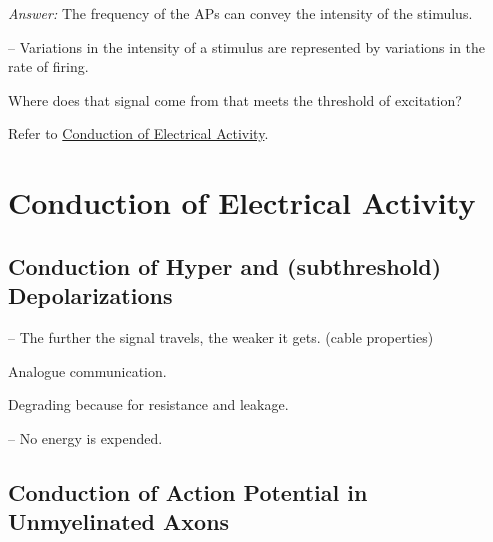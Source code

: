 \begin{coloredlist}
\begin{coloredlist}
\begin{coloredlist}
            \begin{coloredlist}
                \item \textit{Answer:} The frequency of the APs can convey the intensity of the stimulus.
                \item {} -- Variations in the intensity of a stimulus are represented by variations in the rate of firing.
            \end{coloredlist}
            \item Where does that signal come from that meets the threshold of excitation?
            \begin{coloredlist}
                \item Refer to \hyperlink{sec:electrical activity}{Conduction of Electrical Activity}.
            \end{coloredlist}
        \end{coloredlist}
    \end{coloredlist}
\end{coloredlist}

\hypertarget{sec:electrical activity}{}
\section{Conduction of Electrical Activity}

\subsection{Conduction of Hyper and (subthreshold) Depolarizations}

\begin{coloredlist}
    \item {} -- The further the signal travels, the weaker it gets. (cable properties)
    \begin{coloredlist}
        \item Analogue communication.
        \begin{coloredlist}
            \item Degrading because for resistance and leakage.
        \end{coloredlist}
        \item {} -- No energy is expended.
    \end{coloredlist}
\end{coloredlist}

\subsection{Conduction of Action Potential in Unmyelinated Axons}

